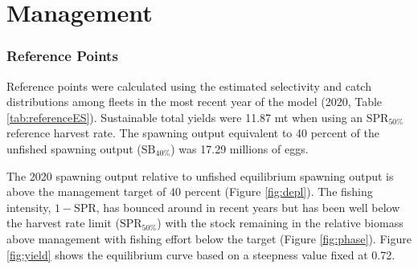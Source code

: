 \documentclass[11pt,
  english,
  a4paper,
]{article}
\begin{document}
\leavevmode\tagmcend\tagstructend\par


\hypertarget{management}{%
\section{Management}\label{management}}

\leavevmode\tagmcend\tagstructend


\hypertarget{reference-points}{%
\subsubsection{Reference Points}\label{reference-points}}

\leavevmode\tagmcend\tagstructend


Reference points were calculated using the estimated selectivity and catch distributions among fleets in the most recent year of the model (2020, Table \ref{tab:referenceES}). Sustainable total yields were 11.87 mt when using an {\(\text{SPR}_{50\%}\)\leavevmode\tagmcend\tagstructend} reference harvest rate. The spawning output equivalent to 40 percent of the unfished spawning output ({\(\text{SB}_{40\%}\)\leavevmode\tagmcend\tagstructend}) was 17.29 millions of eggs.

\leavevmode\tagmcend\tagstructend\par


The 2020 spawning output relative to unfished equilibrium spawning output is above the management target of 40 percent (Figure \ref{fig:depl}). The fishing intensity, {\(1-\text{SPR}\)\leavevmode\tagmcend\tagstructend}, has bounced around in recent years but has been well below the harvest rate limit ({\(\text{SPR}_{50\%}\)\leavevmode\tagmcend\tagstructend}) with the stock remaining in the relative biomass above management with fishing effort below the target (Figure \ref{fig:phase}). Figure \ref{fig:yield} shows the equilibrium curve based on a steepness value fixed at 0.72.
\end{document}
